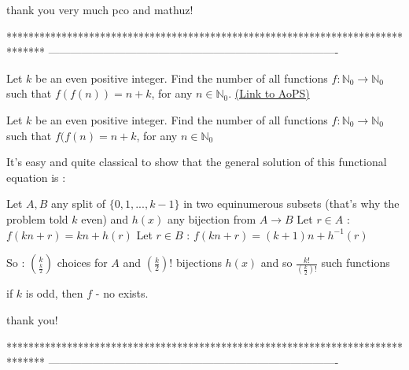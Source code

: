 \begin{solution}
	thank you very much pco and mathuz!
\end{solution}
*******************************************************************************
-------------------------------------------------------------------------------

\begin{problem}
	Let $ k $ be an even positive integer. Find the number of all functions  $ f: \mathbb{N}_0 \rightarrow \mathbb{N}_0 $ such that $ f(f(n))=n+k $, for any $ n\in\mathbb{N}_0 $.
	\flushright \href{https://artofproblemsolving.com/community/c6h534201}{(Link to AoPS)}
\end{problem}



\begin{solution}
	\begin{tcolorbox}Let $ k $ be an even positive integer. Find the number of all functions  $ f: \mathbb{N}_0 \rightarrow \mathbb{N}_0 $ such that $ f(f(n)=n+k $, for any $ n\in\mathbb{N}_0 $\end{tcolorbox}
It's easy and quite classical to show that the general solution of this functional equation is :

Let $A,B$ any split of $\{0,1,...,k-1\}$ in two equinumerous subsets (that's why the problem told $k$ even) and $h(x)$ any bijection from $A\to B$
Let $r\in A$ : $f(kn+r)=kn+h(r)$
Let $r\in B$ : $f(kn+r)=(k+1)n+h^{-1}(r)$

So : $\binom k{\frac k2}$ choices for $A$ and $\left(\frac k2\right)!$ bijections $h(x)$ and so $\boxed{\frac{k!}{\left(\frac k2\right)!}}$ such functions
\end{solution}



\begin{solution}
	if  $k$  is  odd,   then  $f$ - no exists.
\end{solution}



\begin{solution}
	thank you!
\end{solution}
*******************************************************************************
-------------------------------------------------------------------------------

